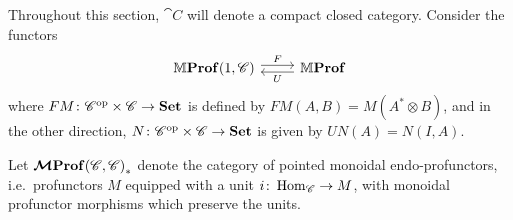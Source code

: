 \documentclass[12pt,oneside,article,draft]{memoir}
\begin{document}
Throughout this section, $\cat{C}$ will denote a compact closed category.
Consider the functors
\begin{equation}\label{eqn:functors 1C CC}
\begin{tikzcd}
	\dMProf(1,\cat{C}) \ar[r,shift left,"F"]
	& \dMProf \ar[l,shift left,"U"]
\end{tikzcd}
\end{equation}
where $FM\colon{\mathscr{C}}^{\text{op}}\times\mathscr{C}\to\mathbf{Set}$ is defined by $FM(A,B)=M(A^*\otimes B)$, and in the other direction, $N\colon{\mathscr{C}}^{\text{op}}\times\mathscr{C}\to\mathbf{Set}$ is given by $UN(A)=N(I,A)$.

Let $\bm{\mathcal{M}}\mathbf{Prof}{(\mathscr{C},\mathscr{C})}_{\ast}$ denote the category of pointed monoidal endo-profunctors, i.e.~profunctors $M$ equipped with a unit $i\colon\operatorname{Hom}_{\mathscr{C}}\to M$, with monoidal profunctor morphisms which preserve the units.
\end{document}
